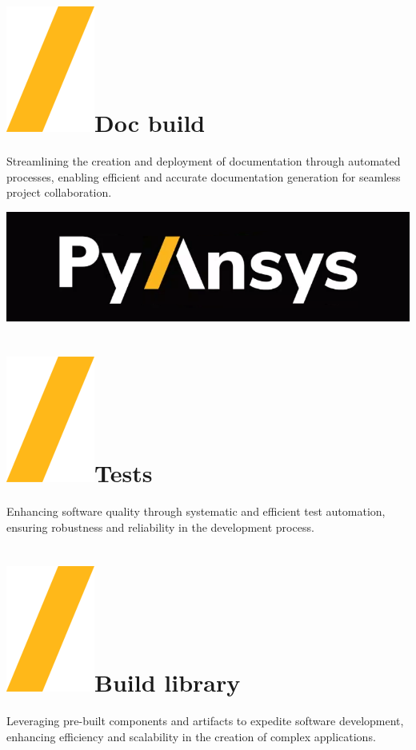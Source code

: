 \documentclass[a0paper,fleqn]{src/betterposter}
\begin{document}
{\section{\includegraphics[height=\fontcharht\font`\S]{img/general/slash.png}Doc build}
Streamlining the creation and deployment of documentation through automated
processes, enabling efficient and accurate documentation generation for seamless
project collaboration.

\vfill

\includegraphics[width=\textwidth]{img/general/pyansys_dark}\\

}{

\section{\includegraphics[height=\fontcharht\font`\S]{img/general/slash.png}Tests}
Enhancing software quality through systematic and efficient test automation,
ensuring robustness and reliability in the development process.

\section{\includegraphics[height=\fontcharht\font`\S]{img/general/slash.png}Build library}
Leveraging pre-built components and artifacts to expedite software development,
enhancing efficiency and scalability in the creation of complex applications.

}
\end{document}
